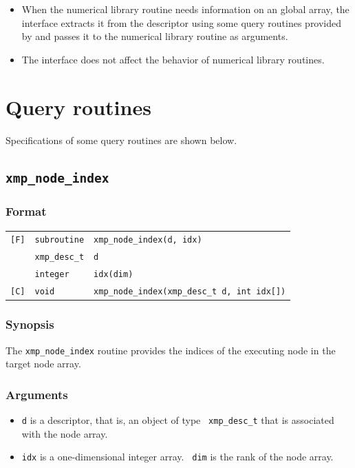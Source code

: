 \begin{itemize}
 \item When the numerical library routine needs information on an global
       array, the interface extracts it from the descriptor using some
       query routines provided by {\XMP} and passes it to the
       numerical library routine as arguments.
%
 \item The interface does not affect the behavior of numerical library
       routines.
\end{itemize}


\section{Query routines}

Specifications of some query routines are shown below.

\subsection{\tt xmp\_node\_index}

\subsubsection*{Format}

\begin{tabular}{lll}

\verb![F]!& {\tt subroutine}& {\tt xmp\_node\_index(d, idx)}\\
          & {\tt xmp\_desc\_t} & {\tt d}\\
          & {\tt integer} & {\tt idx(dim)}\\

\verb![C]!&  {\tt void}& {\tt xmp\_node\_index(xmp\_desc\_t d, int idx[])}\\

\end{tabular}

\subsubsection*{Synopsis}

The {\tt xmp\_node\_index} routine provides the indices of the
executing node in the target node array.

\subsubsection*{Arguments}

\begin{itemize}
 \item {\tt d} is a descriptor, that is, an object of type {\tt
       xmp\_desc\_t} that is associated with the node array.
 \item {\tt idx} is a one-dimensional integer array. {\tt
       dim} is the rank of the node array.
\end{itemize}


